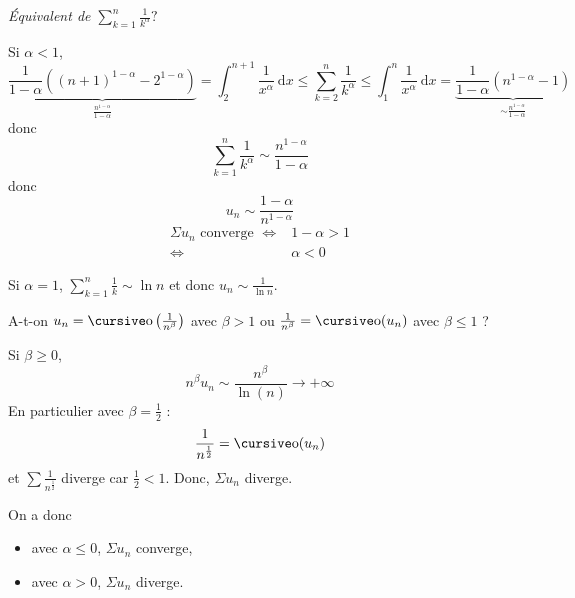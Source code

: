 \begin{exo}
\begin{enumerate}
			{\itshape Équivalent de $\sum_{k=1}^n \frac{1}{k^\alpha} ?$}

			Si $\alpha < 1$, \[
				\underbrace{\frac{1}{1-\alpha} \left( (n+1)^{1-\alpha} - 2^{1-\alpha} \right)}_{\frac{n^{1-\alpha}}{1-\alpha}}
				= \int_{2}^{n+1} \frac{1}{x^{\alpha}}~\mathrm{d}x
				\le \sum_{k=2}^n \frac{1}{k^\alpha}
				\le \int_{1}^{n} \frac{1}{x^\alpha}~\mathrm{d}x
				= \underbrace{\frac{1}{1-\alpha} \left( n^{1-\alpha} - 1 \right)}_
				{\sim \frac{n^{1-\alpha}}{1-\alpha}}
			\] donc \[
				\sum_{k=1}^n \frac{1}{k^\alpha} \sim \frac{n^{1-\alpha}}{1-\alpha}
			\] donc \[
				u_n \sim \frac{1-\alpha}{n^{1-\alpha}}
			\]
			\begin{align*}
				\Sigma u_n \text{ converge } \iff& 1 - \alpha > 1\\
				\iff& \alpha < 0
			\end{align*}

			Si $\alpha = 1$, $\sum_{k=1}^n \frac{1}{k} \sim \ln n$ et donc $u_n \sim \frac{1}{\ln n}$.

			A-t-on $u_n = \po\left( \frac{1}{n^\beta} \right)$ avec $\beta>1$ ou $\frac{1}{n^\beta} = \po(u_n)$ avec $\beta \le 1$ ?

			Si $\beta \ge 0$, \[
				n^\beta u_n \sim \frac{n^\beta}{\ln(n)} \longrightarrow +\infty
			\] En particulier avec $\beta = \frac{1}{2}$ : \[
				\frac{1}{n^{\frac{1}{2}}} = \po(u_n)
			\] et $\sum \frac{1}{n^{\frac{1}{2}}}$ diverge car $\frac{1}{2} < 1$. Donc, $\Sigma u_n$ diverge.

			On a donc 
			\begin{itemize}
				\item avec $\alpha \le 0$, $\Sigma u_n$ converge,
				\item avec $\alpha > 0$, $\Sigma u_n$ diverge.
			\end{itemize}
	\end{enumerate}
\end{exo}
